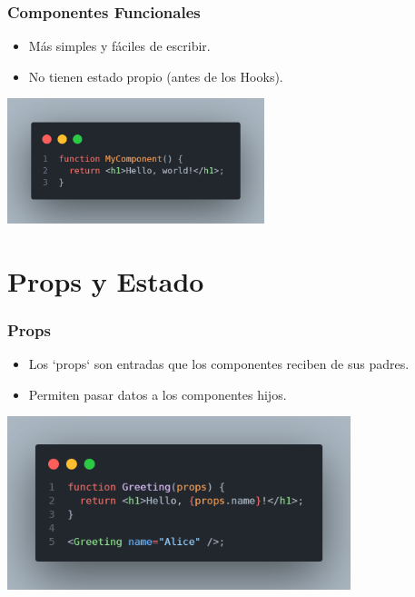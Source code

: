 \documentclass[10pt]{beamer}
\begin{document}
\begin{frame}[fragile]
  \frametitle{Componentes Funcionales}
  \begin{itemize}
    \item Más simples y fáciles de escribir.
    \item No tienen estado propio (antes de los Hooks).
  \end{itemize}
    \includegraphics[width=75mm,scale=0.25]{myComponentFunction.png}
\end{frame}

\section{Props y Estado}

\begin{frame}[fragile]
  \frametitle{Props}
  \begin{itemize}
    \item Los `props` son entradas que los componentes reciben de sus padres.
    \item Permiten pasar datos a los componentes hijos.
  \end{itemize}
    \includegraphics[width=100mm,scale=0.25]{03-props.png}

\end{frame}
\end{document}
